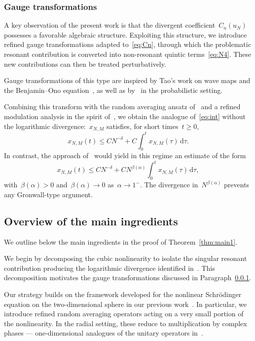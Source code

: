 \documentclass[11pt,reqno,english]{amsart}
\numberwithin{equation}{section}
\theoremstyle{plain}
\theoremstyle{definition}
\theoremstyle{remark}
\begin{document}
\subsubsection{Gauge transformations}
\label{sec:gauge}
A key observation of the present work is that the divergent coefficient~$C_{n}(u_{N})$ possesses a favorable algebraic structure.
Exploiting this structure, we introduce refined gauge transformations adapted to~\eqref{eq:Cn}, through which the problematic resonant contribution is converted into non-resonant quintic terms~\eqref{eq:N4}. These new contributions can then be treated perturbatively.

Gauge transformations of this type are inspired by Tao's work on wave maps and the Benjamin--Ono equation~\cite{Tao01,Tao04}, as well as by~\cite{OTW20} in the probabilistic setting.

Combining this transform with the random averaging ansatz of~\cite{DNY24} and a refined modulation analysis in the spirit of~\cite{BCST24}, we obtain the analogue of~\eqref{eq:int} without the logarithmic divergence:~$x_{N,M}$ satisfies, for short times~$t\geq0$,
\begin{equation}
	\label{eq:int2}
	x_{N,M}(t)\leq CN^{-\delta}+C\int_{0}^{t}x_{N,M}(\tau)\,\mathrm{d}\tau.
\end{equation}
In contrast, the approach of~\cite{BB14} would yield in this regime an estimate of the form
\begin{equation}
	\label{eq:int3}
	x_{N,M}(t)\leq CN^{-\delta}
	+CN^{\beta(\alpha)}\int_{0}^{t}x_{N,M}(\tau)\,\mathrm{d}\tau,
\end{equation}
with~$\beta(\alpha)>0$ and~$\beta(\alpha)\to 0$ as~$\alpha\to 1^{-}$. The divergence in~$N^{\beta(\alpha)}$ prevents any Gronwall-type argument.
	
	\subsection{Overview of the main ingredients}
We outline below the main ingredients in the proof of Theorem~\ref{thm:main1}.

We begin by decomposing the cubic nonlinearity to isolate the singular resonant contribution producing the logarithmic divergence identified in~\cite{BB14}.
This decomposition motivates the gauge transformations discussed in Paragraph~\ref{sec:gauge}.

Our strategy builds on the framework developed for the nonlinear Schrödinger equation on the two-dimensional sphere in our previous work~\cite{BCST24}.
In particular, we introduce refined random averaging operators acting on a very small portion of the nonlinearity.
In the radial setting, these reduce to multiplication by complex phases --- one-dimensional analogues of the unitary operators in~\cite{BCST24}.
\end{document}
